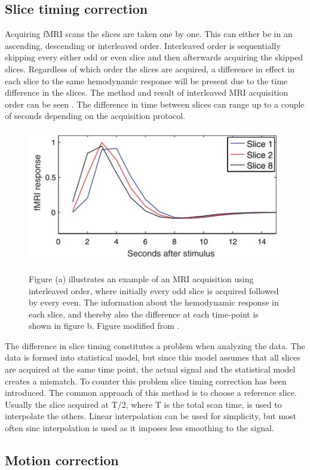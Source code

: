 \subsection{Slice timing correction} 

Acquiring fMRI scans the slices are taken one by one. This can either be in an ascending, descending or interleaved order. Interleaved order is sequentially skipping every either odd or even slice and then afterwards acquiring the skipped slices. Regardless of which order the slices are acquired, a difference in effect in each slice to the same hemodynamic response will be present due to the time difference in the slices. The method and result of interleaved MRI acquisition order can be seen . The difference in time between slices can range up to a couple of seconds depending on the acquisition protocol. 
\begin{figure}[H] 
	{\includegraphics[width=.40\textwidth]{figures/aBackground/response}}  
	\caption{Figure (a) illustrates an example of an MRI acquisition using interleaved order, where initially every odd slice is acquired followed by every even. The information about the hemodynamic response in each slice, and thereby also the difference at each time-point is shown in figure b. Figure modified from \cite{Poldrack2011}.}
	\label{fig:meth:slice}
\end{figure}

The difference in slice timing constitutes a problem when analyzing the data. The data is formed into statistical model, but since this model assumes that all slices are acquired at the same time point, the actual signal and the statistical model creates a mismatch. To counter this problem slice timing correction has been introduced. The common approach of this method is to choose a reference slice. Usually the slice acquired at T/2, where T is the total scan time, is used to interpolate the others. Linear interpolation can be used for simplicity, but most often sinc interpolation is used as it imposes less smoothing to the signal. \cite{Poldrack2011} 

\subsection{Motion correction}

